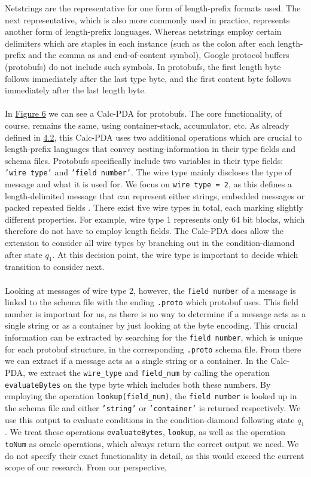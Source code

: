 Netstrings are the representative for one form of length-prefix formats used. The next representative, which is also more commonly used in practice, represents another form of length-prefix languages. Whereas netstrings employ certain delimiters which are staples in each instance (such as the colon after each length-prefix and the comma as and end-of-content symbol), Google protocol buffers (protobufs) do not include such symbols. In protobufs, the first length byte follows immediately after the last type byte, and the first content byte follows immediately after the last length byte.\\\\ In \hyperref[fig:fig-6-protobuf-Calc-pda-1]{Figure 6} we can see a Calc-PDA for protobufs. The core functionality, of course, remains the same, using container-stack, accumulator, etc. As already defined in \hyperref[4.2]{4.2}, this Calc-PDA uses two additional operations which are crucial to length-prefix languages that convey nesting-information in their type fields and schema files. Protobufs specifically include two variables in their type fields: \texttt{'wire type'} and \texttt{'field number'}. The wire type mainly discloses the type of message and what it is used for. We focus on \texttt{wire type = 2}, as this defines a length-delimited message that can represent either strings, embedded messages or packed repeated fields \cite{google-protobuf-wire-type}. There exist five wire types in total, each marking slightly different properties. For example, wire type 1 represents only 64 bit blocks, which therefore do not have to employ length fields. The Calc-PDA does allow the extension to consider all wire types by branching out in the condition-diamond after state $q_1$. At this decision point, the wire type is important to decide which transition to consider next. \\\\Looking at messages of wire type 2, however, the \texttt{field number} of a message is linked to the schema file with the ending \texttt{.proto} which protobuf uses. This field number is important for us, as there is no way to determine if a message acts as a single string or as a container by just looking at the byte encoding. This crucial information can be extracted by searching for the \texttt{field number}, which is unique for each protobuf structure, in the corresponding \texttt{.proto} schema file. From there we can extract if a message acts as a single string or a container. In the Calc-PDA, we extract the \texttt{wire\_type} and \texttt{field\_num} by calling the operation \texttt{evaluateBytes} on the type byte which includes both these numbers. By employing the operation \texttt{lookup(field\_num)}, the \texttt{field number} is looked up in the schema file and either \texttt{'string'} or \texttt{'container'} is returned respectively. We use this output to evaluate conditions in the condition-diamond following state $q_1$. We treat these operations \texttt{evaluateBytes}, \texttt{lookup}, as well as the operation \texttt{toNum} as oracle operations, which always return the correct output we need. We do not specify their exact functionality in detail, as this would exceed the current scope of our research. From our perspective, 